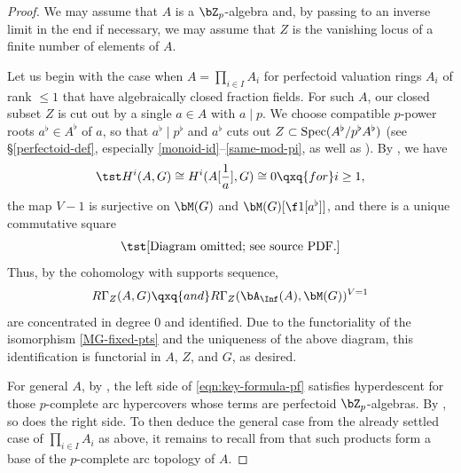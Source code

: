 \begin{proof}
We may assume that $A$ is a $\bZ_p$-algebra and, by passing to an inverse limit in the end if necessary, we may assume that $Z$ is the vanishing locus of a finite number of elements of $A$. %

Let us begin with the case when $A = \prod_{i \in I} A_i$ for perfectoid valuation rings $A_i$ of rank $\le 1$ that have algebraically closed fraction fields. For such $A$, our closed subset $Z$ is cut out by a single $a \in A$ with $a \mid p$. %
We choose compatible $p$-power roots $a^\flat \in A^\flat$ of $a$, so that $a^\flat \mid p^\flat$ and $a^\flat$ cuts out $Z \subset \operatorname{Spec}(A^\flat/p^\flat A^\flat)$ (see \S\ref{perfectoid-def}, especially \eqref{monoid-id}--\eqref{same-mod-pi}, as well as ). By , we have
\[
\tst H^i(A,G) \cong H^i(A[\frac 1a],G) \cong 0 \qxq{for} i \ge 1,
\]
the map $V - 1$ is surjective on $\bM(G)$ and $\bM(G)[\f 1{[a^\flat]}]$, %
and there is a unique commutative square
\begin{equation*}
\tst \text{[Diagram omitted; see source PDF.]}
\end{equation*}
Thus, by the cohomology with supports sequence,
\[
R\Gamma_Z(A, G) \qxq{and} R\Gamma_{Z}(\bA_\Inf(A), \bM(G))^{V = 1}
\]
are concentrated in degree $0$ and identified. Due to the functoriality of the isomorphism \eqref{MG-fixed-pts} and the uniqueness of the above diagram, this identification is functorial in $A$, $Z$, and $G$, as desired.

For general $A$, by , the left side of \eqref{eqn:key-formula-pf} satisfies hyperdescent for those $p$-complete arc hypercovers whose terms are perfectoid $\bZ_p$-algebras. By , so does the right side. To then deduce the general case from the already settled case of $\prod_{i \in I} A_i$ as above, it remains to recall from  that such products form a base of the $p$-complete arc topology of $A$.
\end{proof}






